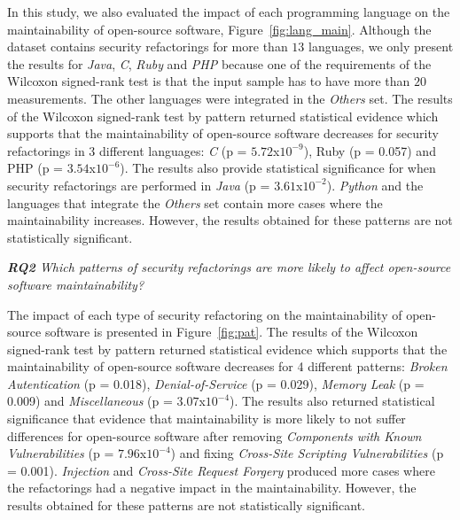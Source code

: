 \documentclass[10pt,conference]{IEEEtran}
\begin{document}
{In this study, we also evaluated the impact of each programming language on the
maintainability of open-source software, Figure~\ref{fig:lang_main}. Although the
dataset contains security refactorings for more than $13$ languages, we only
present the results for \emph{Java}, \emph{C}, \emph{Ruby} and \emph{PHP} because
one of the requirements of the Wilcoxon signed-rank test is that the input sample
has to have more than $20$ measurements. The other languages were integrated in the
\emph{Others} set. The results of the Wilcoxon signed-rank test by pattern returned
statistical evidence which supports that the maintainability of open-source software
decreases for security refactorings in 3 different languages: \emph{C}
(p = $5.72$x$10^{-9}$), Ruby (p = 0.057) and PHP (p = $3.54$x$10^{-6}$). The results
also provide statistical significance for when security refactorings are performed
in \emph{Java} (p = $3.61$x$10^{-2}$). \emph{Python} and the languages
that integrate the \emph{Others} set contain more cases where the maintainability
increases. However, the results obtained for these patterns are not statistically
significant.



\begin{framed}
\textit{\textbf{RQ2} Which patterns of security refactorings are more likely to
affect open-source software maintainability?}
\end{framed}

The impact of each type of security refactoring on the maintainability of
open-source software is presented in Figure~\ref{fig:pat}. The results of the
Wilcoxon signed-rank test by pattern returned statistical evidence which
supports that the maintainability of open-source software decreases for 4
different patterns: \emph{Broken Autentication} (p = 0.018), \emph{Denial-of-Service}
(p = 0.029), \emph{Memory Leak} (p = 0.009) and \emph{Miscellaneous} (p = $3.07$x$10^{-4}$).
The results also returned statistical significance that evidence that maintainability
is more likely to not suffer differences for open-source software after removing
\emph{Components with Known Vulnerabilities} (p = $7.96$x$10^{-4}$) and fixing \emph{Cross-Site
Scripting Vulnerabilities} (p = 0.001). \emph{Injection} and \emph{Cross-Site Request Forgery}
produced more cases where the refactorings had a negative impact in the maintainability.
However, the results obtained for these patterns are not statistically significant.

}
\end{document}
